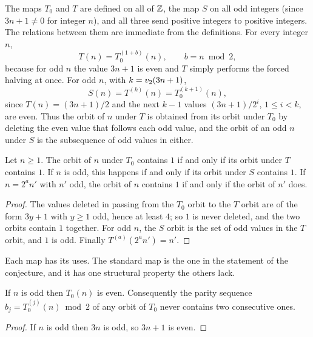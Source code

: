 The maps $T_0$ and $T$ are defined on all of $\mathbb{Z}$, the map $S$ on all odd
integers (since $3n+1\neq0$ for integer $n$), and all three send positive
integers to positive integers. The relations between them are
immediate from the definitions. For every integer $n$,
\begin{equation}\label{eq:ch2:TT0}
  T(n)=T_0^{(1+b)}(n),\qquad b=n\bmod2,
\end{equation}
because for odd $n$ the value $3n+1$ is even and $T$ simply performs the
forced halving at once. For odd $n$, with $k=v_2(3n+1)$,
\begin{equation}\label{eq:ch2:ST}
  S(n)=T^{(k)}(n)=T_0^{(k+1)}(n),
\end{equation}
since $T(n)=(3n+1)/2$ and the next $k-1$ values $(3n+1)/2^i$, $1\leq i<k$, are
even. Thus the orbit of $n$ under $T$ is obtained from its orbit under $T_0$
by deleting the even value that follows each odd value, and the orbit of an
odd $n$ under $S$ is the subsequence of odd values in either.

\begin{proposition}\label{prop:ch2:equiv}
Let $n\geq1$. The orbit of $n$ under $T_0$ contains $1$ if and only if its
orbit under $T$ contains $1$. If $n$ is odd, this happens if and only if its
orbit under $S$ contains $1$. If $n=2^a n'$ with $n'$ odd, the orbit of $n$
contains $1$ if and only if the orbit of $n'$ does.
\end{proposition}

\begin{proof}
The values deleted in passing from the $T_0$ orbit to the $T$ orbit are of the
form $3y+1$ with $y\geq1$ odd, hence at least $4$; so $1$ is never deleted, and
the two orbits contain $1$ together. For odd $n$, the $S$ orbit is the set of
odd values in the $T$ orbit, and $1$ is odd. Finally $T^{(a)}(2^a n')=n'$.
\end{proof}

Each map has its uses. The standard map is the one in the statement of the
conjecture, and it has one structural property the others lack.

\begin{lemma}\label{prop:nocons}
If $n$ is odd then $T_0(n)$ is even. Consequently the parity sequence
$b_j=T_0^{(j)}(n)\bmod2$ of any orbit of $T_0$ never contains two consecutive
ones.
\end{lemma}

\begin{proof}
If $n$ is odd then $3n$ is odd, so $3n+1$ is even.
\end{proof}

